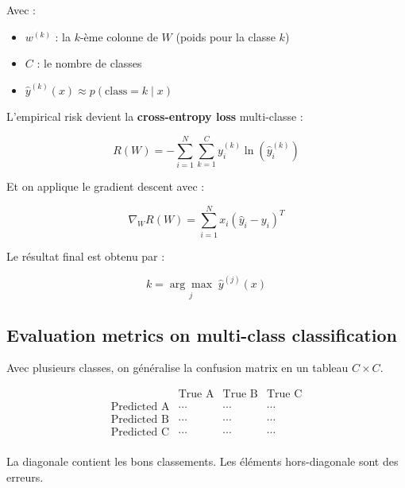 \documentclass[11pt,a4paper,openany]{book}
\begin{document}
\vspace{0.5cm}

Avec :

\begin{itemize}
    \item $w^{(k)}$ : la $k$-ème colonne de $W$ (poids pour la classe $k$)
    \item $C$ : le nombre de classes
    \item $\hat{y}^{(k)}(x) \approx p(\text{class} = k \mid x)$
\end{itemize}

\vspace{0.6cm}

L'empirical risk devient la \textbf{cross-entropy loss} multi-classe :

\[
R(W)
=
-
\sum_{i=1}^{N}
\sum_{k=1}^{C}
y_i^{(k)}
\ln\left(\hat{y}_i^{(k)}\right)
\]

\vspace{0.6cm}

Et on applique le gradient descent avec :

\[
\nabla_W R(W)
=
\sum_{i=1}^{N}
x_i
(\hat{y}_i - y_i)^T
\]

\vspace{0.8cm}

Le résultat final est obtenu par :

\[
k =
\underset{j}{\arg\max}
\;
\hat{y}^{(j)}(x)
\]

\vspace{8cm}

\subsection{Evaluation metrics on multi-class classification}

Avec plusieurs classes, on généralise la confusion matrix en un tableau $C \times C$.

\vspace{0.6cm}

\begin{exbox}[title=Confusion matrix -- 3 classes]
\[
\begin{array}{c|c|c|c}
& \text{True A} & \text{True B} & \text{True C} \\
\hline
\text{Predicted A} & \cdots & \cdots & \cdots \\
\hline
\text{Predicted B} & \cdots & \cdots & \cdots \\
\hline
\text{Predicted C} & \cdots & \cdots & \cdots \\
\end{array}
\]

\vspace{0.4cm}

La diagonale contient les bons classements. Les éléments hors-diagonale sont des erreurs.
\end{exbox}
\end{document}

